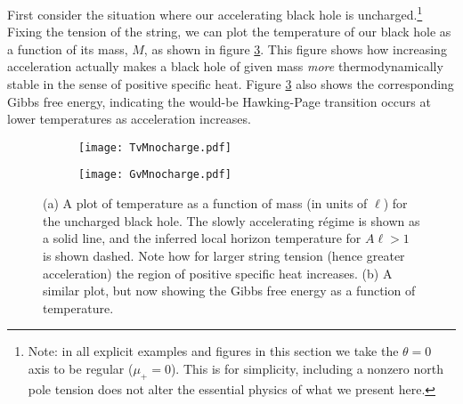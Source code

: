 \documentclass[
twoside,
openright,
frontopenright,
]{dmathesis}
\begin{document}
First consider the situation where our accelerating black hole is
uncharged.\footnote{ Note: in all explicit examples and figures in this section
  we take the $\theta=0$ axis to be regular ($\mu_+=0$). This is for simplicity,
  including a nonzero north pole tension does not alter the essential physics of
  what we present here.}  Fixing the tension of the string, we can plot the
temperature of our black hole as a function of its mass, $M$, as shown in figure
\ref{fig:TvMnocharge}.  This figure shows how increasing acceleration actually
makes a black hole of given mass {\it more} thermodynamically stable in the
sense of positive specific heat. Figure \ref{fig:TvMnocharge} also shows the
corresponding Gibbs free energy, indicating the would-be Hawking-Page transition
occurs at lower temperatures as acceleration increases.
\begin{figure}
  \centering
  \begin{subfigure}[b]{0.45\textwidth}
    \texttt{[image: TvMnocharge.pdf]}
    \caption{\label{fig:TvMnochargea}}
  \end{subfigure}\quad
  \begin{subfigure}[b]{0.45\textwidth}
    \texttt{[image: GvMnocharge.pdf]}
    \caption{\label{fig:TvMnocharge}}
  \end{subfigure}
  \caption{\label{fig:TvMnocharge}(a) A plot of temperature as a
    function of mass (in units of $\ell$) for the uncharged black hole.  The
    slowly accelerating r\'egime is shown as a solid line, and the inferred
    local horizon temperature for $A\ell>1$ is shown dashed. Note how for larger
    string tension (hence greater acceleration) the region of positive specific
    heat increases. (b) A similar plot, but now showing the Gibbs free
    energy as a function of temperature.}
\end{figure}
\end{document}
